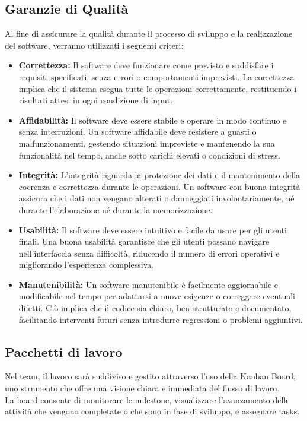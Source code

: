 \documentclass[a4paper,12pt]{article}
\begin{document}
\subsection{Garanzie di Qualità} %
Al fine di assicurare la qualità durante il processo di sviluppo e la realizzazione del software,
verranno utilizzati i seguenti criteri:  
\begin{itemize}
    \item \textbf{Correttezza:}  
    Il software deve funzionare come previsto e soddisfare i requisiti specificati, senza errori o comportamenti imprevisti. La correttezza implica che il sistema esegua tutte le operazioni correttamente, restituendo i risultati attesi in ogni condizione di input.

    \item \textbf{Affidabilità:}  
    Il software deve essere stabile e operare in modo continuo e senza interruzioni. Un software affidabile deve resistere a guasti o malfunzionamenti, gestendo situazioni impreviste e mantenendo la sua funzionalità nel tempo, anche sotto carichi elevati o condizioni di stress.

    \item \textbf{Integrità:}  
    L'integrità riguarda la protezione dei dati e il mantenimento della coerenza e correttezza durante le operazioni. Un software con buona integrità assicura che i dati non vengano alterati o danneggiati involontariamente, né durante l'elaborazione né durante la memorizzazione.

    \item \textbf{Usabilità:}  
    Il software deve essere intuitivo e facile da usare per gli utenti finali. Una buona usabilità garantisce che gli utenti possano navigare nell'interfaccia senza difficoltà, riducendo il numero di errori operativi e migliorando l'esperienza complessiva.

    \item \textbf{Manutenibilità:}  
    Un software manutenibile è facilmente aggiornabile e modificabile nel tempo per adattarsi a nuove esigenze o correggere eventuali difetti. Ciò implica che il codice sia chiaro, ben strutturato e documentato, facilitando interventi futuri senza introdurre regressioni o problemi aggiuntivi.
\end{itemize}

\subsection{Pacchetti di lavoro} %
Nel team, il lavoro sarà suddiviso e gestito attraverso l'uso della Kanban Board, uno strumento che offre una visione chiara e immediata del flusso di lavoro.\\ 
La board consente di monitorare le milestone, visualizzare l'avanzamento delle attività che vengono completate o che sono in fase di sviluppo, e assegnare tasks.
\end{document}
